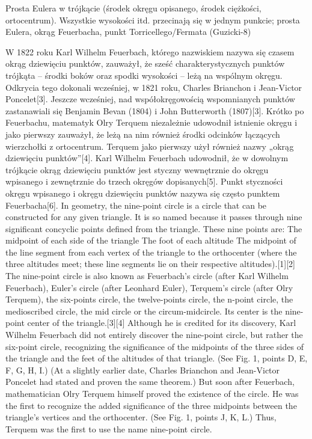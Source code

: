 %

Prosta Eulera w trójkącie (środek okręgu opisanego, środek ciężkości, ortocentrum).
Wszystkie wysokości itd. przecinają się w jednym punkcie; prosta Eulera, okrąg Feuerbacha, punkt Torricellego/Fermata (Guzicki-8)

W 1822 roku Karl Wilhelm Feuerbach, którego nazwiskiem nazywa się czasem okrąg dziewięciu punktów, zauważył, że sześć charakterystycznych punktów trójkąta – środki boków oraz spodki wysokości – leżą na wspólnym okręgu. Odkrycia tego dokonali wcześniej, w 1821 roku, Charles Brianchon i Jean-Victor Poncelet[3]. Jeszcze wcześniej, nad współokręgowością wspomnianych punktów zastanawiali się Benjamin Bevan (1804) i John Butterworth (1807)[3].
Krótko po Feuerbachu, matematyk Olry Terquem niezależnie udowodnił istnienie okręgu i jako pierwszy zauważył, że leżą na nim również środki odcinków łączących wierzchołki z ortocentrum. Terquem jako pierwszy użył również nazwy „okrąg dziewięciu punktów”[4].
Karl Wilhelm Feuerbach udowodnił, że w dowolnym trójkącie okrąg dziewięciu punktów jest styczny wewnętrznie do okręgu wpisanego i zewnętrznie do trzech okręgów dopisanych[5]. Punkt styczności okręgu wpisanego i okręgu dziewięciu punktów nazywa się często punktem Feuerbacha[6].
In geometry, the nine-point circle is a circle that can be constructed for any given triangle. It is so named because it passes through nine significant concyclic points defined from the triangle. These nine points are:
The midpoint of each side of the triangle
The foot of each altitude
The midpoint of the line segment from each vertex of the triangle to the orthocenter (where the three altitudes meet; these line segments lie on their respective altitudes).[1][2]
The nine-point circle is also known as Feuerbach's circle (after Karl Wilhelm Feuerbach), Euler's circle (after Leonhard Euler), Terquem's circle (after Olry Terquem), the six-points circle, the twelve-points circle, the n-point circle, the medioscribed circle, the mid circle or the circum-midcircle. Its center is the nine-point center of the triangle.[3][4]
Although he is credited for its discovery, Karl Wilhelm Feuerbach did not entirely discover the nine-point circle, but rather the six-point circle, recognizing the significance of the midpoints of the three sides of the triangle and the feet of the altitudes of that triangle. (See Fig. 1, points D, E, F, G, H, I.) (At a slightly earlier date, Charles Brianchon and Jean-Victor Poncelet had stated and proven the same theorem.) But soon after Feuerbach, mathematician Olry Terquem himself proved the existence of the circle. He was the first to recognize the added significance of the three midpoints between the triangle's vertices and the orthocenter. (See Fig. 1, points J, K, L.) Thus, Terquem was the first to use the name nine-point circle.
